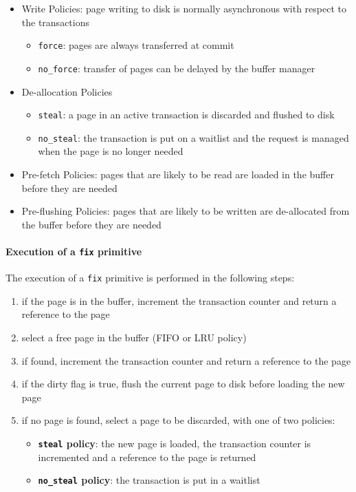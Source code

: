 \documentclass[english]{article}
\begin{document}
\begin{itemize}
  \item Write Policies: page writing to disk is normally asynchronous with respect to the transactions
        \begin{itemize}[label=\texttt{>}]
          \item \texttt{force}: pages are always transferred at commit
          \item \texttt{no\_force}: transfer of pages can be delayed by the buffer manager
        \end{itemize}
  \item De-allocation Policies
        \begin{itemize}[label=\texttt{>}]
          \item \texttt{steal}: a page in an active transaction is discarded and flushed to disk
          \item \texttt{no\_steal}: the transaction is put on a waitlist and the request is managed when the page is no longer needed
        \end{itemize}
  \item Pre-fetch Policies: pages that are likely to be read are loaded in the buffer before they are needed
  \item Pre-flushing Policies: pages that are likely to be written are de-allocated from the buffer before they are needed
\end{itemize}

\paragraph{Execution of a \texttt{fix} primitive}

The execution of a \texttt{fix} primitive is performed in the following steps:

\begin{enumerate}
  \item if the page is in the buffer, increment the transaction counter and return a reference to the page
  \item select a free page in the buffer (FIFO or LRU policy)
  \item if found, increment the transaction counter and return a reference to the page
  \item if the dirty flag is true, flush the current page to disk before loading the new page
  \item if no page is found, select a page to be discarded, with one of two policies:
        \begin{itemize}[label=\texttt{>}]
          \item \textbf{\texttt{steal} policy}: the new page is loaded, the transaction counter is incremented and a reference to the page is returned
          \item \textbf{\texttt{no\_steal} policy}: the transaction is put in a waitlist
        \end{itemize}
\end{enumerate}
\end{document}
